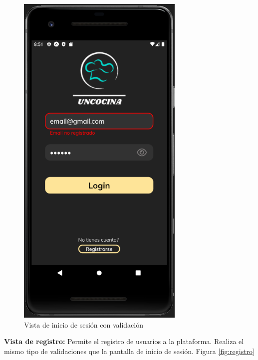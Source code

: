 \begin{figure}[!h]
  \centering
  \includegraphics[width=8cm, scale=1]{Images/Imagenes/login2.png}
  \caption{Vista de inicio de sesión con validación}
  \label{fig:login2}
\end{figure}

\textbf{Vista de registro: }
Permite el registro de usuarios a la plataforma. Realiza el mismo tipo de validaciones que la pantalla de inicio de sesión. Figura \ref{fig:registro}\\

